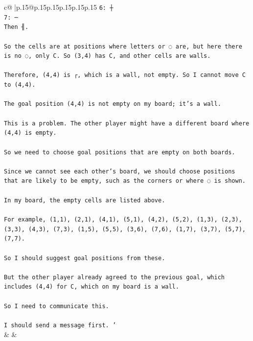 \documentclass{article}
\begin{document}
{\begin{supertabular}{c@{$\;$}|p{.15\linewidth}@{}p{.15\linewidth}p{.15\linewidth}p{.15\linewidth}p{.15\linewidth}p{.15\linewidth}}
{{{\texttt{6: ┼} \\
\texttt{7: ─} \\
\texttt{Then ╢.} \\
\\ 
\texttt{So the cells are at positions where letters or ◌ are, but here there is no ◌, only C. So (3,4) has C, and other cells are walls.} \\
\\ 
\texttt{Therefore, (4,4) is ┌, which is a wall, not empty. So I cannot move C to (4,4).} \\
\\ 
\texttt{The goal position (4,4) is not empty on my board; it's a wall.} \\
\\ 
\texttt{This is a problem. The other player might have a different board where (4,4) is empty.} \\
\\ 
\texttt{So we need to choose goal positions that are empty on both boards.} \\
\\ 
\texttt{Since we cannot see each other's board, we should choose positions that are likely to be empty, such as the corners or where ◌ is shown.} \\
\\ 
\texttt{In my board, the empty cells are listed above.} \\
\\ 
\texttt{For example, (1,1), (2,1), (4,1), (5,1), (4,2), (5,2), (1,3), (2,3), (3,3), (4,3), (7,3), (1,5), (5,5), (3,6), (7,6), (1,7), (3,7), (5,7), (7,7).} \\
\\ 
\texttt{So I should suggest goal positions from these.} \\
\\ 
\texttt{But the other player already agreed to the previous goal, which includes (4,4) for C, which on my board is a wall.} \\
\\ 
\texttt{So I need to communicate this.} \\
\\ 
\texttt{I should send a message first.      '} \\
            }
        }
    }
    & & \\ \\


\end{supertabular}}
\end{document}
